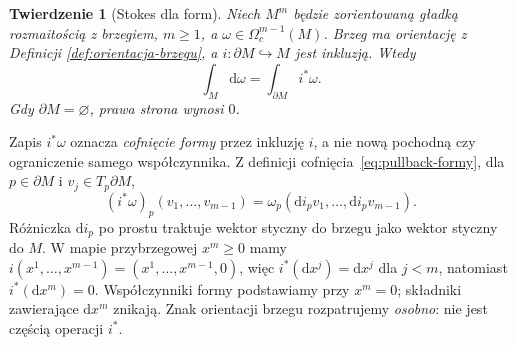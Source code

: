 \documentclass[11pt,a4paper,oneside]{report}
\newcommand{\dd}{\mathrm d}
\theoremstyle{plain}
\newtheorem{twierdzenie}{Twierdzenie}[section]
\theoremstyle{definition}
\theoremstyle{remark}
\begin{document}
\begin{twierdzenie}[Stokes dla form]
\label{thm:stokes-formy}
Niech $M^m$ będzie zorientowaną gładką rozmaitością
z brzegiem, $m\geq1$, a $\omega\in\Omega_c^{m-1}(M)$.
Brzeg ma orientację z Definicji
\ref{def:orientacja-brzegu}, a
$i:\partial M\hookrightarrow M$ jest \emph{inkluzją}.
Wtedy
\begin{equation}\label{eq:stokes-formy}
 {\displaystyle \int_M\dd\omega
        =\int_{\partial M}i^*\omega.}
\end{equation}
Gdy $\partial M=\varnothing$, prawa strona wynosi $0$.
\end{twierdzenie}

Zapis $i^*\omega$ oznacza \emph{cofnięcie formy}
przez inkluzję $i$, a nie nową pochodną czy
ograniczenie samego współczynnika. Z definicji
cofnięcia~\eqref{eq:pullback-formy}, dla
$p\in\partial M$ i $v_j\in T_p\partial M$,
\begin{equation}\label{eq:inkluzja-formy}
 (i^*\omega)_p(v_1,\ldots,v_{m-1})
 =\omega_p(\dd i_pv_1,\ldots,\dd i_pv_{m-1}).
\end{equation}
Różniczka $\dd i_p$ po prostu traktuje wektor
styczny do brzegu jako wektor styczny do $M$.
W mapie przybrzegowej $x^m\geq0$ mamy
$i(x^1,\ldots,x^{m-1})=(x^1,\ldots,x^{m-1},0)$,
więc $i^*(\dd x^j)=\dd x^j$ dla $j<m$, natomiast
$i^*(\dd x^m)=0$. Współczynniki formy podstawiamy
przy $x^m=0$; składniki zawierające $\dd x^m$
znikają. Znak orientacji brzegu rozpatrujemy
\emph{osobno}: nie jest częścią operacji $i^*$.
\end{document}
